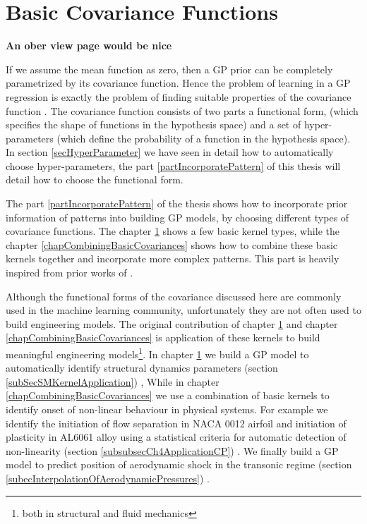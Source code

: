 \chapter{Basic Covariance Functions}
\label{chapBasicCovarianceKernels}
\textbf{An ober view page would be nice}

If we assume the mean function as zero, then a GP prior can be completely parametrized by its covariance function. Hence the problem of learning in a GP regression is exactly the problem of finding suitable properties of the covariance function \cite{rasmussen2006gaussian}. The covariance function consists of two parts a functional form, (which specifies the shape of functions in the hypothesis space) and a set of hyper-parameters (which define the probability of a function in the hypothesis space). In section \ref{secHyperParameter} we have seen in detail how to automatically choose hyper-parameters, the part \ref{partIncorporatePattern} of this thesis will detail how to choose the functional form. 

The part \ref{partIncorporatePattern} of the thesis shows how to incorporate prior information of patterns into building GP models, by choosing different types of covariance functions. The chapter \ref{chapBasicCovarianceKernels} shows a few basic kernel types, while the chapter \ref{chapCombiningBasicCovariances} shows how to combine these basic kernels together and incorporate more complex patterns. This part is heavily inspired from prior works of \cite{duvenaud-thesis-2014, wilson2014thesis, lloyd2014automatic, durrande2001etude}. 

Although the functional forms of the covariance discussed here are commonly used in the machine learning community, unfortunately they are not often used to build engineering models. The original contribution of chapter \ref{chapBasicCovarianceKernels} and chapter \ref{chapCombiningBasicCovariances} is application of these kernels to build meaningful engineering models\footnote{both in structural and fluid mechanics}. In chapter \ref{chapBasicCovarianceKernels} we build a GP model to automatically identify structural dynamics parameters (section \ref{subSecSMKernelApplication}) \cite{chiplunkar2017operational}, While in chapter \ref{chapCombiningBasicCovariances} we use a combination of basic kernels to identify onset of non-linear behaviour in physical systems. For example we identify the initiation of flow separation in NACA 0012 airfoil and initiation of plasticity in AL6061 alloy using a statistical criteria for automatic detection of non-linearity (section \ref{subsubsecCh4ApplicationCP}) \cite{chiplunkar:hal-01555401}. We finally build a GP model to predict position of aerodynamic shock in the transonic regime (section \ref{subecInterpolationOfAerodynamicPressures}) \cite{oatao18004}. 
  
